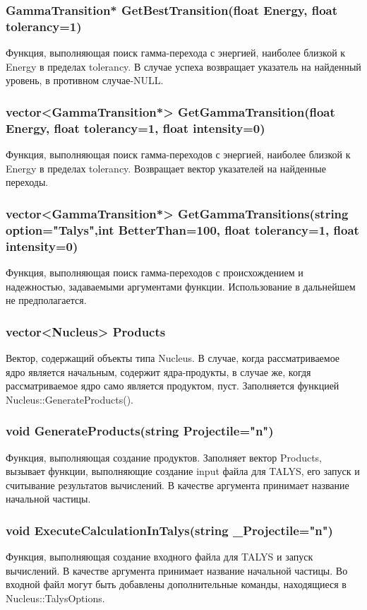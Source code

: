 \documentclass[a4paper,12pt]{extarticle}
\begin{document}
\subsubsection{GammaTransition* GetBestTransition(float Energy, float tolerancy=1)}
Функция, выполняющая поиск гамма-перехода с энергией, наиболее близкой к Energy в пределах tolerancy. В случае успеха возвращает указатель на найденный уровень, в противном случае-NULL.
\subsubsection{vector<GammaTransition*> GetGammaTransition(float Energy, float tolerancy=1, float intensity=0)}
Функция, выполняющая поиск гамма-переходов с энергией, наиболее близкой к Energy в пределах tolerancy. Возвращает вектор указателей на найденные переходы.
\subsubsection{vector<GammaTransition*> GetGammaTransitions(string option="Talys",int BetterThan=100, float tolerancy=1, float intensity=0)}
Функция, выполняющая поиск гамма-переходов с происхождением и надежностью, задаваемыми аргументами функции. Использование в дальнейшем не предполагается.
\subsubsection{vector<Nucleus> Products}
Вектор, содержащий объекты типа Nucleus. В случае, когда рассматриваемое ядро является начальным, содержит ядра-продукты, в случае же, когдя рассматриваемое ядро само является продуктом, пуст. Заполняется функцией Nucleus::GenerateProducts().
\subsubsection{void GenerateProducts(string Projectile="n")}
Функция, выполняющая создание продуктов. Заполняет вектор Products, вызывает функции, выполняющие создание input файла для TALYS, его запуск и считывание результатов вычислений. В качестве аргумента принимает название начальной частицы.
\subsubsection{void ExecuteCalculationInTalys(string _Projectile="n")}
Функция, выполняющая создание входного файла для TALYS и запуск вычислений. В качестве аргумента принимает название начальной частицы. Во входной файл могут быть добавлены дополнительные команды, находящиеся в Nucleus::TalysOptions.
\end{document}
